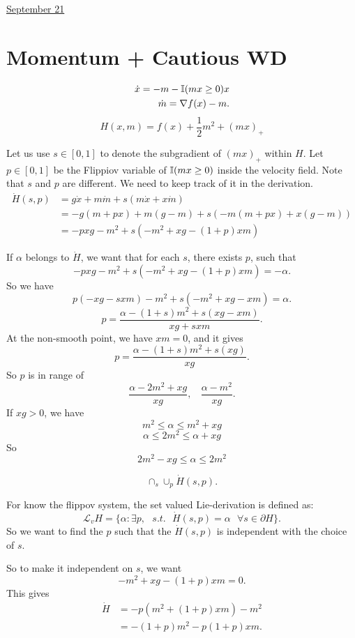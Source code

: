 \documentclass[11pt,letterpaper]{article}
\begin{document}
\href{run:2025-09-21-momentum_cwd.tex}{\Huge September 21} 

\section{Momentum + Cautious WD}

\begin{align}
    \dot x = - m - \mathbb{I}(mx\geq 0) x \\ 
    \dot m = \nabla f(x) - m. 
\end{align}
$$
H(x, m) = f(x) + \frac{1}{2} m^2 + (mx)_+
$$

Let us use $s \in[0,1]$ to denote the subgradient of $(mx)_+$ within $H$. Let $p \in[0,1]$ be the Flippiov variable of $\mathbb{I}(mx \geq 0)$ inside the velocity field. Note that $s$ and $p$ are different. We need to keep track of it in the derivation. 
\begin{align*}
\dot H(s,p) &  =  g \dot x + m \dot m + s (m \dot x + x \dot m) \\ 
& = -g (m + p x) + m(g - m) + s (-m (m + p x) + x (g - m) )\\
& = - p x g - m^2 + s (- m^2 + xg - (1+p)xm)
\end{align*}

If $\alpha$ belongs to $\dot H$, we want that for each $s$, there exists $p$, such that 
$$
- p x g - m^2 + s (- m^2 + xg - (1+p)xm) = -\alpha.
$$
So we have 
$$
p (-xg - s x m ) - m^2 + s (-m^2 + xg - xm) = \alpha. 
$$
$$
p = \frac{\alpha -(1+s) m^2 + s (xg - xm)}{xg +  s xm}. 
$$
At the non-smooth point, we have $xm =0$, and it gives 
$$
p = \frac{\alpha -(1+s) m^2 + s (xg)}{xg}.  
$$
So $p$ is in range of 
$$
\frac{\alpha - 2m^2 + xg}{xg}, ~~~~ 
\frac{\alpha - m^2 }{xg}. 
$$
If $xg >0$, we have 
$$
m^2 \leq \alpha \leq m^2 + xg
$$
$$
\alpha \leq 2m^2 \leq \alpha + xg 
$$
So 
$$
2m^2  - xg \leq \alpha \leq 2 m^2
$$

$$\cap_{s} \cup_{p} \dot H(s, p).$$


For know the flippov system, the set valued Lie-derivation is defined as:
$$
\mathcal L_v H  =   
\{\alpha \colon \exists p, ~~~ s.t. ~~~ \dot H(s,p) = \alpha ~~~\forall s \in \partial H \}.
$$
So we want to find the $p$ such that the $\dot H(s,p)$ is independent with the choice of $s$. 

So to make it independent on $s$, we want 
$$
-m^2 + xg -(1+p)xm  = 0.
$$
This gives
\begin{align*}
\dot H 
& = -p(m^2 + (1+p) xm)- m^2 \\
& = -(1+p)m^2 - p(1+p) xm. 
\end{align*}
\end{document}
